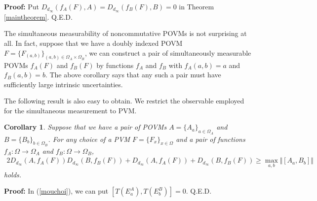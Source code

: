 \documentclass[showpacs,preprintnumbers,amsmath,amssymb]{revtex4}
\newtheorem{corollary}{Corollary}
\begin{document}
{\bf Proof:}
Put $D_{d_{\infty}}(f_A(F),A)=D_{d_{\infty}}(f_B(F),B)=0$ in 
Theorem \ref{maintheorem}.
\hfill Q.E.D.
\par
The simultaneous measurability of noncommutative POVMs 
is not surprising at all. In fact, suppose that we have 
a doubly indexed POVM $F=\{F_{(a,b)}\}_{(a,b)\in \Omega_A \times \Omega_B}$, 
we can construct a pair of 
simultaneously measurable
POVMs $f_A(F)$ and $f_B(F)$ 
by functions $f_A$ and $f_B$ with $f_A(a,b)=a$ and $f_B(a,b)=b$.
The above corollary says that any such a pair must have 
sufficiently large intrinsic uncertainties. 
\par
The following result is also easy to obtain.
We restrict the observable employed for the simultaneous 
measurement to PVM. 
\begin{corollary}
Suppose that we have a pair of POVMs $A=\{A_a\}_{a\in \Omega_A}$ 
and $B=\{B_b\}_{b\in \Omega_B}$. 
For any choice of a PVM
$F=\{F_x\}_{x\in \Omega}$ and a pair of functions 
$f_A: \Omega \to \Omega_A$ and $f_B: \Omega \to \Omega_B$, 
\begin{eqnarray*}
2 D_{d_{\infty}}(A, f_A(F))D_{d_{\infty}}(B, f_B(F))
+D_{d_{\infty}}(A,f_A(F))+D_{d_{\infty}}(B,f_B(F))
\geq \max_{a,b}\Vert[A_a,B_b]\Vert
\end{eqnarray*}
holds. 
\end{corollary}
{\bf Proof:}
In (\ref{mouchoi}), we can put $[T(E^A_a),T(E^B_b)]=0$.
\hfill Q.E.D.
\end{document}
